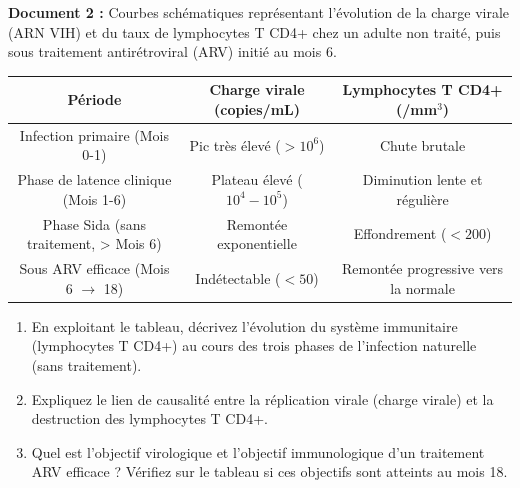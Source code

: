 \documentclass[11pt]{article}
\begin{document}
\begin{exercice}
\textbf{Document 2 :} Courbes schématiques représentant l'évolution de la charge virale (ARN VIH) et du taux de lymphocytes T CD4+ chez un adulte non traité, puis sous traitement antirétroviral (ARV) initié au mois 6.
\begin{center}
\begin{tabular}{|c|c|c|}
\hline
\textbf{Période} & \textbf{Charge virale (copies/mL)} & \textbf{Lymphocytes T CD4+ (/mm$^3$)} \\
\hline
Infection primaire (Mois 0-1) & Pic très élevé ($>10^6$) & Chute brutale \\
\hline
Phase de latence clinique (Mois 1-6) & Plateau élevé ($10^4 - 10^5$) & Diminution lente et régulière \\
\hline
Phase Sida (sans traitement, > Mois 6) & Remontée exponentielle & Effondrement ($< 200$) \\
\hline
Sous ARV efficace (Mois 6 $\rightarrow$ 18) & Indétectable ($< 50$) & Remontée progressive vers la normale \\
\hline
\end{tabular}
\end{center}
\begin{enumerate}
    \item En exploitant le tableau, décrivez l'évolution du système immunitaire (lymphocytes T CD4+) au cours des trois phases de l'infection naturelle (sans traitement).
    \item Expliquez le lien de causalité entre la réplication virale (charge virale) et la destruction des lymphocytes T CD4+.
    \item Quel est l'objectif virologique et l'objectif immunologique d'un traitement ARV efficace ? Vérifiez sur le tableau si ces objectifs sont atteints au mois 18.
\end{enumerate}
\end{exercice}
\end{document}
